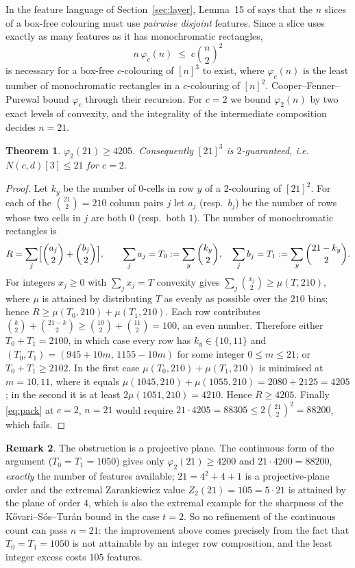 \documentclass[11pt]{article}
\newtheorem{theorem}{Theorem}
\theoremstyle{definition}
\newtheorem{remark}[theorem]{Remark}
\newcommand{\Ncd}{N(c,d)}
\begin{document}
In the feature language of Section~\ref{sec:layer}, Lemma~15 of \cite{CFP} says that
the $n$ slices of a box-free colouring must use \emph{pairwise disjoint} features. Since a
slice uses exactly as many features as it has monochromatic rectangles,
\begin{equation}\label{eq:pack}
n\,\varphi_c(n)\;\le\;c\binom{n}{2}^{2}
\end{equation}
is necessary for a box-free $c$-colouring of $[n]^3$ to exist, where $\varphi_c(n)$ is the
least number of monochromatic rectangles in a $c$-colouring of $[n]^{2}$.
Cooper--Fenner--Purewal bound $\varphi_c$ through their recursion. For $c=2$ we bound
$\varphi_2(n)$ by two exact levels of convexity, and the integrality of the intermediate
composition decides $n=21$.

\begin{theorem}\label{thm:upper2}
$\varphi_2(21)\ge 4205$. Consequently $[21]^3$ is $2$-guaranteed, i.e.\ $\Ncd[3]\le21$
for $c=2$.
\end{theorem}

\begin{proof}
Let $k_y$ be the number of $0$-cells in row $y$ of a $2$-colouring of $[21]^2$. For each
of the $\binom{21}{2}=210$ column pairs $j$ let $a_j$ (resp.\ $b_j$) be the number of rows
whose two cells in $j$ are both $0$ (resp.\ both $1$). The number of monochromatic
rectangles is
\[
R=\sum_j\Bigl[\binom{a_j}{2}+\binom{b_j}{2}\Bigr],
\qquad
\sum_j a_j=T_0:=\sum_y\binom{k_y}{2},\quad
\sum_j b_j=T_1:=\sum_y\binom{21-k_y}{2}.
\]
For integers $x_j\ge0$ with $\sum_j x_j=T$ convexity gives
$\sum_j\binom{x_j}{2}\ge\mu(T,210)$, where $\mu$ is attained by distributing $T$ as evenly
as possible over the $210$ bins; hence $R\ge\mu(T_0,210)+\mu(T_1,210)$. Each row
contributes $\binom{k}{2}+\binom{21-k}{2}\ge\binom{10}{2}+\binom{11}{2}=100$, an even
number. Therefore either $T_0+T_1=2100$, in which case every row has $k_y\in\{10,11\}$
and $(T_0,T_1)=(945+10m,\,1155-10m)$ for some integer $0\le m\le21$; or $T_0+T_1\ge2102$.
In the first case $\mu(T_0,210)+\mu(T_1,210)$ is minimised at $m=10,11$, where it equals
$\mu(1045,210)+\mu(1055,210)=2080+2125=4205$; in the second it is at least
$2\mu(1051,210)=4210$. Hence $R\ge4205$.
Finally \eqref{eq:pack} at $c=2$, $n=21$ would require
$21\cdot4205=88305\le2\binom{21}{2}^{2}=88200$, which fails.
\end{proof}

\begin{remark}\label{rem:pp}
The obstruction is a projective plane. The continuous form of the argument ($T_0=T_1=1050$)
gives only $\varphi_2(21)\ge4200$ and $21\cdot4200=88200$, \emph{exactly} the number of
features available; $21=4^2+4+1$ is a projective-plane order and the extremal Zarankiewicz
value $Z_2(21)=105=5\cdot21$ is attained by the plane of order $4$, which is also the
extremal example for the sharpness of the K\H{o}vari--S\'os--Tur\'an bound in the case
$t=2$. So no refinement of the continuous count can pass $n=21$: the improvement above
comes precisely from the fact that $T_0=T_1=1050$ is not attainable by an integer row
composition, and the least integer excess costs $105$ features.
\end{remark}
\end{document}
